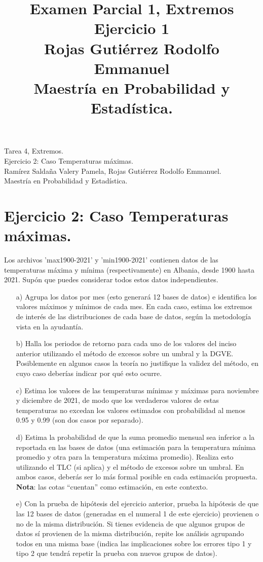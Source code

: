 \documentclass[10.5pt,notitlepage]{article}
\title{Examen Parcial 1, Extremos \\
Ejercicio 1\\
Rojas Gutiérrez Rodolfo Emmanuel\\ 
Maestría en Probabilidad y Estadística.}
\author{}
\theoremstyle{plain}
\begin{document}
\begin{flushleft}
Tarea 4, Extremos.\\
Ejercicio 2: Caso Temperaturas máximas.\\   
Ramírez Saldaña Valery Pamela, Rojas Gutiérrez Rodolfo Emmanuel.\\
Maestría en Probabilidad y Estadística.
\end{flushleft}

\section{Ejercicio 2: Caso Temperaturas máximas.}
\setcounter{exo}{1}
\begin{exo}
\item Los archivos 'max1900-2021' y 'min1900-2021' contienen datos de las temperaturas máxima y mínima (respectivamente) en Albania, desde 1900 hasta 2021. Supón que puedes considerar todos estos datos independientes.
\begin{itemize}
\item[a)] Agrupa los datos por mes (esto generará 12 bases de datos) e identifica los valores máximos y mínimos de cada mes. En cada caso, estima los extremos de interés de las distribuciones de cada base de datos, según la metodología vista en la ayudantía.

\item[b)] Halla los periodos de retorno para cada uno de los valores del inciso anterior utilizando el método de excesos sobre un umbral y la DGVE. Posiblemente en algunos casos la teoría no justifique la validez del método, en cuyo caso deberías indicar por qué esto ocurre.

\item[c)] Estima los valores de las temperaturas mínimas y máximas para noviembre y diciembre de 2021, de modo que los verdaderos valores de estas temperaturas no excedan los valores estimados con probabilidad al menos 0.95 y 0.99 (son dos casos por separado).

\item[d)] Estima la probabilidad de que la suma promedio mensual sea inferior a la reportada en las bases de datos (una estimación para la temperatura mínima promedio y otra para la temperatura máxima promedio). Realiza esto utilizando el TLC (si aplica) y el método de excesos sobre un umbral. En ambos casos, deberás ser lo más formal posible en cada estimación propuesta. \textbf{Nota}: las cotas ``cuentan'' como estimación, en este contexto.

\item[e)] Con la prueba de hipótesis del ejercicio anterior, prueba la hipótesis de que las 12 bases de datos (generadas en el numeral 1 de este ejercicio) provienen o no de la misma distribución. Si tienes evidencia de que algunos grupos de datos sí provienen de la misma distribución, repite los análisis agrupando todos en una misma base (indica las implicaciones sobre los errores tipo 1 y tipo 2 que tendrá repetir la prueba con nuevos grupos de datos).
\end{itemize}
\end{exo}
\end{document}
